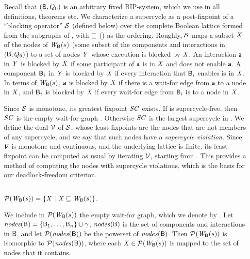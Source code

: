 Recall that $(\mathsf{B}, Q_0)$ is an arbitrary fixed BIP-system, which
we use in all definitions, theorems etc.
%
We characterize a supercycle as a post-fixpoint of a ``blocking operator'' $\mathcal{S}$ (defined below) over the complete Boolean lattice formed from the
subgraphs of , with $\sqsubseteq$ () as the ordering.
%
Roughly, $\mathcal{S}$ maps a subset $\mathit{X}$ of the nodes of $\mathit{W}_{\mathsf{B}}({s})$ (\ie some subset of the components and interactions in $(\mathsf{B}, Q_0)$)
to a set of nodes $\mathit{Y}$ whose execution is blocked by $\mathit{X}$. An interaction $\mathsf{a}$ in $\mathit{Y}$ is blocked by $\mathit{X}$ if some participant of $\mathsf{a}$ is in $\mathit{X}$ and does
not enable $\mathsf{a}$. A component $\mathsf{B}_i$  in $\mathit{Y}$ is blocked by $\mathit{X}$ if every interaction that $\mathsf{B}_i$ enables is in $\mathit{X}$. In terms of $\mathit{W}_{\mathsf{B}}({s})$,
$\mathsf{a}$ is blocked by $\mathit{X}$ if there is a wait-for edge from $\mathsf{a}$ to a node in $\mathit{X}$, and $\mathsf{B}_i$ is blocked by $\mathit{X}$ if every wait-for edge from $\mathsf{B}_i$ is to a
node in $\mathit{X}$. 

Since $\mathcal{S}$ is monotone, its greatest fixpoint $\mathit{SC}$ exists.  If  is supercycle-free, then $\mathit{SC}$ is the empty wait-for graph \ewfg.
Otherwise $\mathit{SC}$ is the largest supercycle in .  We define the dual $\mathcal{V}$ of $\mathcal{S}$, whose least fixpoints are the nodes that are not
members of any supercycle, and we say that such nodes have a \emph{supercycle violation}. Since 
$\mathcal{V}$ is monotone and continuous, and the underlying lattice is finite, its least fixpoint can be computed as usual by iterating $\mathcal{V}$, starting from \ewfg.
This provides a method of computing the nodes with supercycle violations, which is the basis for our deadlock-freedom criterion.



\subsection{}
\label{secn:supercycle-fixpoint}

\begin{definition} \label{defn:wsetOfSubgraphs}
$\mathcal{P}(\mathit{W}_{\mathsf{B}}({s})) = \{  \mathit{X} ~|~ \mathit{X} \sqsubseteq \mathit{W}_{\mathsf{B}}({s})  \}$.
\end{definition}
We include in $\mathcal{P}(\mathit{W}_{\mathsf{B}}({s}))$ the empty wait-for graph, which we denote by \ewfg.
Let $\mathit{nodes}(\mathsf{B}) = \{ \mathsf{B}_1,\ldots,\mathsf{B}_n \} \cup \gamma$, \ie  $\mathit{nodes}(\mathsf{B})$ is the set of components and interactions in $\mathsf{B}$, and
let $\mathcal{P}(\mathit{nodes}(\mathsf{B}))$ be the powerset of $\mathit{nodes}(\mathsf{B})$.
Then $\mathcal{P}(\mathit{W}_{\mathsf{B}}({s}))$ is isomorphic to $\mathcal{P}(\mathit{nodes}(\mathsf{B}))$, where each $\mathit{X} \in \mathcal{P}(\mathit{W}_{\mathsf{B}}({s}))$ is mapped to the set of nodes that it contains.


